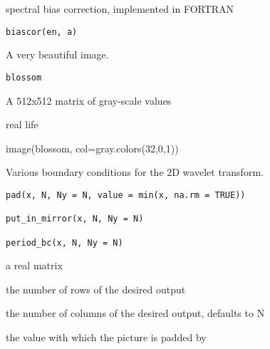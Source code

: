 \documentclass[a4paper]{book}
\begin{document}
%
\begin{Description}\relax
spectral bias correction, implemented in FORTRAN
\end{Description}
%
\begin{Usage}
\begin{verbatim}
biascor(en, a)
\end{verbatim}
\end{Usage}
%
\begin{Description}\relax
A very beautiful image.
\end{Description}
%
\begin{Usage}
\begin{verbatim}
blossom
\end{verbatim}
\end{Usage}
%
\begin{Format}
A 512x512 matrix of gray-scale values
\end{Format}
%
\begin{Source}\relax
real life
\end{Source}
%
\begin{Examples}
\begin{ExampleCode}
image(blossom, col=gray.colors(32,0,1))
\end{ExampleCode}
\end{Examples}
%
\begin{Description}\relax
Various boundary conditions for the 2D wavelet transform.
\end{Description}
%
\begin{Usage}
\begin{verbatim}
pad(x, N, Ny = N, value = min(x, na.rm = TRUE))

put_in_mirror(x, N, Ny = N)

period_bc(x, N, Ny = N)
\end{verbatim}
\end{Usage}
%
\begin{Arguments}
\begin{ldescription}
\item[\code{x}] a real matrix

\item[\code{N}] the number of rows of the desired output

\item[\code{Ny}] the number of columns of the desired output, defaults to N

\item[\code{value}] the value with which the picture is padded by 
\end{ldescription}
\end{Arguments}
\end{document}
